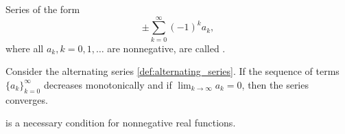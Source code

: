 \begin{definition}\label{def:alternating_series}
  Series of the form
  \begin{equation}\label{def:alternating_series/series}
    \pm \sum_{k=0}^\infty (-1)^k a_k,
  \end{equation}
  where all \( a_k, k = 0, 1, \ldots \) are nonnegative, are called .
\end{definition}

\begin{proposition}\label{leibniz_alternating_series_test}
  Consider the alternating series \cref{def:alternating_series}. If the sequence of terms \( \{ a_k \}_{k=0}^\infty \) decreases monotonically and if \( \lim_{k \to \infty} a_k = 0 \), then the series converges.
\end{proposition}

\begin{theorem}\label{thm:weierstrass_series_criterion_nessessity}\cite[]{Фихтенгольц1968/2}
   is a necessary condition for nonnegative real functions.
\end{theorem}
